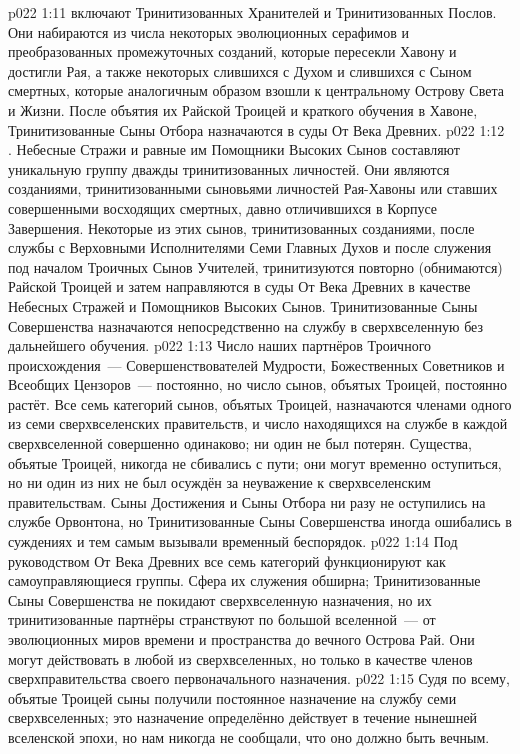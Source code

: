 \vs p022 1:11 \pc {} включают Тринитизованных Хранителей и Тринитизованных Послов. Они набираются из числа некоторых эволюционных серафимов и преобразованных промежуточных созданий, которые пересекли Хавону и достигли Рая, а также некоторых слившихся с Духом и слившихся с Сыном смертных, которые аналогичным образом взошли к центральному Острову Света и Жизни. После объятия их Райской Троицей и краткого обучения в Хавоне, Тринитизованные Сыны Отбора назначаются в суды От Века Древних.
\vs p022 1:12 \pc {}. Небесные Стражи и равные им Помощники Высоких Сынов составляют уникальную группу дважды тринитизованных личностей. Они являются созданиями, тринитизованными сыновьями личностей Рая\hyp{}Хавоны или ставших совершенными восходящих смертных, давно отличившихся в Корпусе Завершения. Некоторые из этих сынов, тринитизованных созданиями, после службы с Верховными Исполнителями Семи Главных Духов и после служения под началом Троичных Сынов Учителей, тринитизуются повторно (обнимаются) Райской Троицей и затем направляются в суды От Века Древних в качестве Небесных Стражей и Помощников Высоких Сынов. Тринитизованные Сыны Совершенства назначаются непосредственно на службу в сверхвселенную без дальнейшего обучения.
\vs p022 1:13 \pc Число наших партнёров Троичного происхождения~--- Совершенствователей Мудрости, Божественных Советников и Всеобщих Цензоров~--- постоянно, но число сынов, объятых Троицей, постоянно растёт. Все семь категорий сынов, объятых Троицей, назначаются членами одного из семи сверхвселенских правительств, и число находящихся на службе в каждой сверхвселенной совершенно одинаково; ни один не был потерян. Существа, объятые Троицей, никогда не сбивались с пути; они могут временно оступиться, но ни один из них не был осуждён за неуважение к сверхвселенским правительствам. Сыны Достижения и Сыны Отбора ни разу не оступились на службе Орвонтона, но Тринитизованные Сыны Совершенства иногда ошибались в суждениях и тем самым вызывали временный беспорядок.
\vs p022 1:14 Под руководством От Века Древних все семь категорий функционируют как самоуправляющиеся группы. Сфера их служения обширна; Тринитизованные Сыны Совершенства не покидают сверхвселенную назначения, но их тринитизованные партнёры странствуют по большой вселенной~--- от эволюционных миров времени и пространства до вечного Острова Рай. Они могут действовать в любой из сверхвселенных, но только в качестве членов сверхправительства своего первоначального назначения.
\vs p022 1:15 Судя по всему, объятые Троицей сыны получили постоянное назначение на службу семи сверхвселенных; это назначение определённо действует в течение нынешней вселенской эпохи, но нам никогда не сообщали, что оно должно быть вечным.
